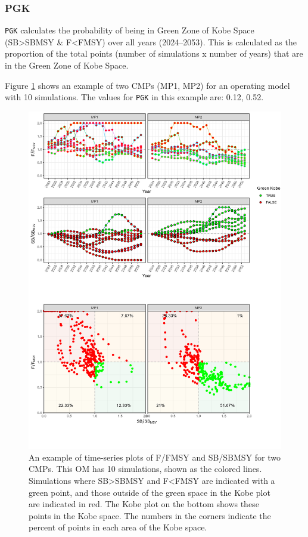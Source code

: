 \documentclass[
]{article}
\begin{document}
\hypertarget{pgk}{%
\subsubsection{PGK}\label{pgk}}

\texttt{PGK} calculates the probability of being in Green Zone of Kobe Space (SB\textgreater SBMSY \& F\textless FMSY) over all years (2024--2053). This is calculated as the proportion of the total points (number of simulations x number of years) that are in the Green Zone of Kobe Space.

Figure \ref{fig:PGK} shows an example of two CMPs (MP1, MP2) for an operating model with 10 simulations. The values for \texttt{PGK} in this example are: 0.12, 0.52.

\begin{figure}
\includegraphics[width=37.5in]{../../img/PMs/PGK} \caption{An example of time-series plots of F/FMSY and SB/SBMSY for two CMPs. This OM has 10 simulations, shown as the colored lines. Simulations where SB>SBMSY and F<FMSY are indicated with a green point, and those outside of the green space in the Kobe plot are indicated in red. The Kobe plot on the bottom shows these points in the Kobe space. The numbers in the corners indicate the percent of points in each area of the Kobe space.}\label{fig:PGK}
\end{figure}
\end{document}
